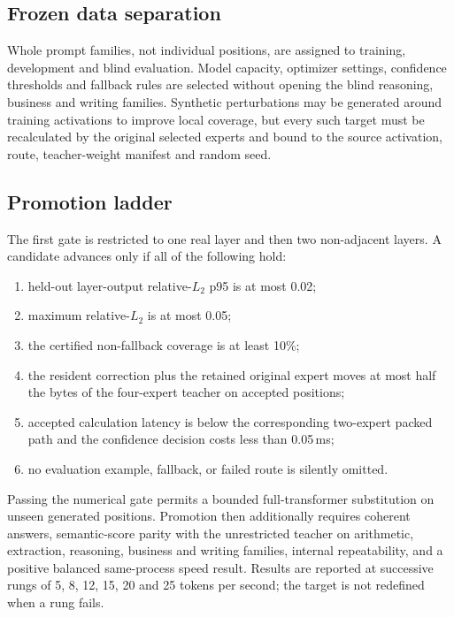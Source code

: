 \subsection{Frozen data separation}

Whole prompt families, not individual positions, are assigned to training,
development and blind evaluation.  Model capacity, optimizer settings,
confidence thresholds and fallback rules are selected without opening the
blind reasoning, business and writing families.  Synthetic perturbations may
be generated around training activations to improve local coverage, but every
such target must be recalculated by the original selected experts and bound to
the source activation, route, teacher-weight manifest and random seed.

\subsection{Promotion ladder}

The first gate is restricted to one real layer and then two non-adjacent
layers.  A candidate advances only if all of the following hold:
\begin{enumerate}
  \item held-out layer-output relative-$L_2$ p95 is at most 0.02;
  \item maximum relative-$L_2$ is at most 0.05;
  \item the certified non-fallback coverage is at least 10\%;
  \item the resident correction plus the retained original expert moves at
        most half the bytes of the four-expert teacher on accepted positions;
  \item accepted calculation latency is below the corresponding two-expert
        packed path and the confidence decision costs less than 0.05\,ms;
  \item no evaluation example, fallback, or failed route is silently omitted.
\end{enumerate}

Passing the numerical gate permits a bounded full-transformer substitution on
unseen generated positions.  Promotion then additionally requires coherent
answers, semantic-score parity with the unrestricted teacher on arithmetic,
extraction, reasoning, business and writing families, internal repeatability,
and a positive balanced same-process speed result.  Results are reported at
successive rungs of 5, 8, 12, 15, 20 and 25 tokens per second; the target is
not redefined when a rung fails.

